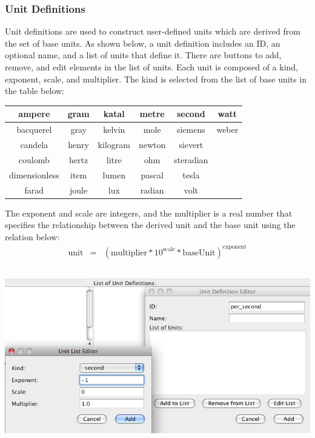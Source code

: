 \documentclass[titlepage,11pt]{article}
\begin{document}
\clearpage

\subsubsection{\label{unitDefn}Unit Definitions}

\noindent
Unit definitions are used to construct user-defined units which are 
derived from the set of base units.  As shown below, a 
unit definition includes an ID, 
an optional name, and a list of units that define it.  There are
buttons to add, remove, and edit elements in the list of units.  
Each unit is composed of a kind, exponent, scale, and multiplier.  The kind 
is selected from the list of base units in the table below:

\begin{center}
\begin{tabular}{|c|c|c|c|c|c|}
\hline
ampere        & gram  & katal    & metre  & second    & watt \\ \hline
bacquerel     & gray  & kelvin   & mole   & siemens   & weber \\ \hline
candela       & henry & kilogram & newton & sievert   & ~\\ \hline
coulomb       & hertz & litre    & ohm    & steradian & ~\\ \hline
dimensionless & item  & lumen    & pascal & tesla     & ~\\ \hline
farad         & joule & lux      & radian & volt      & ~\\ \hline
\end{tabular}
\end{center}

The exponent and scale are integers, and the multiplier is a real
number that specifies the relationship between the derived unit and the
base unit using the relation below:
\begin{eqnarray*}
\mathrm{unit} & = & (\mathrm{multiplier} * 10^\mathrm{scale} * \mathrm{baseUnit})^\mathrm{exponent}
\end{eqnarray*}
\begin{center}
\includegraphics[height=75mm]{screenshots/units}
\end{center}
\end{document}

